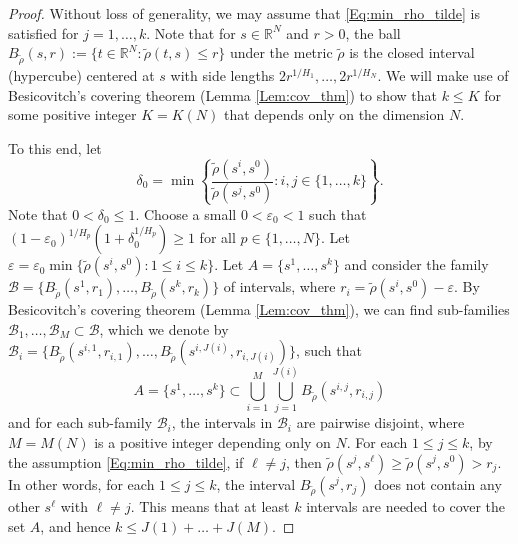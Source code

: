 \documentclass[11pt, reqno]{amsart}
\def\R{{\mathbb R}}
\numberwithin{equation}{section}
\begin{document}
\begin{proof}
Without loss of generality, we may assume that \eqref{Eq:min_rho_tilde} is satisfied for $j = 1, \dots, k$.
Note that for $s \in \R^N$ and $r > 0$, the ball 
$B_{\tilde{\rho}}(s, r) := \{ t \in \R^N: \tilde{\rho}(t, s) \le r \}$ under the metric $\tilde{\rho}$ 
is the closed interval (hypercube) centered at $s$ with side lengths $2r^{1/H_1}, \dots, 2r^{1/H_N}$.
We will make use of Besicovitch's covering theorem (Lemma \ref{Lem:cov_thm}) to show that $k \le K$ for 
some positive integer $K = K(N)$ that depends only on the dimension $N$.

To this end, let 
\[ \delta_0 = \min\left\{\frac{\tilde{\rho}(s^i, s^0)}{\tilde{\rho}(s^j, s^0)} : i, j \in\{1, \dots, k\} \right\}. \]
Note that $0 < \delta_0 \le 1$.
Choose a small $0 < \varepsilon_0 < 1$ such that $(1- \varepsilon_0)^{1/H_p}(1+\delta_0^{1/H_p}) \ge 1$ for 
all $p \in \{1, \dots, N\}$.
Let $\varepsilon = \varepsilon_0 \min\{ \tilde{\rho}(s^i, s^0) : 1 \le i \le k \}$.
Let $A = \{s^1, \dots, s^k\}$ and
consider the family $\mathscr{B} = \{ B_{\tilde{\rho}}(s^1, r_1), \dots, B_{\tilde{\rho}}(s^k, r_k) \}$ of intervals, 
where $r_i = \tilde{\rho}(s^i, s^0)- \varepsilon$. 
By Besicovitch's covering theorem (Lemma \ref{Lem:cov_thm}), we can find sub-families $\mathscr{B}_1, 
\dots, \mathscr{B}_M \subset \mathscr{B}$, which we denote by $\mathscr{B}_i = \{ B_{\tilde{\rho}}(s^{i,1}, r_{i,1}), \dots, 
B_{\tilde{\rho}}(s^{i,J(i)}, r_{i,J(i)}) \}$, such that 
\[ A = \{ s^1, \dots, s^k \} \subset 
\bigcup_{i=1}^M \bigcup_{j=1}^{J(i)} B_{\tilde{\rho}}(s^{i,j}, r_{i,j}) \]
and for each sub-family $\mathscr{B}_i$, the intervals in $\mathscr{B}_i$ are pairwise disjoint, where $M = M(N)$ is 
a positive integer depending only on $N$. For each $1 \le j \le k$, by the assumption \eqref{Eq:min_rho_tilde}, 
if $\ell \ne j$, then $\tilde{\rho}(s^j, s^\ell) \ge \tilde{\rho}(s^j, s^0) > r_j$.
In other words, for each $1 \le j \le k$, the interval $B_{\tilde{\rho}}(s^j, r_j)$ does not contain any other $s^\ell$ with $\ell \ne j$. 
This means that at least $k$ intervals are needed to cover the set $A$, and hence $k \le J(1) + \dots + J(M)$.


\end{proof}
\end{document}
